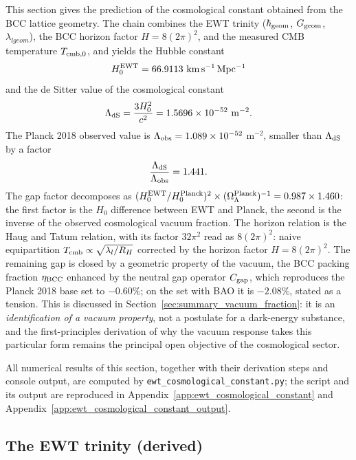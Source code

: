 \documentclass[10pt,a4paper]{article}
\begin{document}
This section gives the prediction of the cosmological constant
obtained from the BCC lattice geometry. The chain combines the EWT
trinity (\(\hbar_{\rm geom}\), \(G_{\rm geom}\), \(\lambda_{l geom}\)), the
BCC horizon factor \(H = 8(2\pi)^2\), and the measured CMB
temperature \(T_{\rm cmb,0}\), and yields the Hubble constant
\begin{equation}
	H_0^{\rm EWT} = 66.9113\ {\rm km\,s^{-1}\,Mpc^{-1}}
	\label{eq:cosmo_H0_intro}
\end{equation}
and the de Sitter value of the cosmological constant
\begin{equation}
	\Lambda_{\rm dS} = \frac{3 H_0^2}{c^2}
	= 1.5696\times 10^{-52}\ {\rm m^{-2}}.
	\label{eq:cosmo_Lambda_intro}
\end{equation}
The Planck 2018 observed value is
$\Lambda_{\rm obs} = 1.089\times 10^{-52}$ m$^{-2}$, smaller than
$\Lambda_{\rm dS}$ by a factor
\begin{equation}
	\frac{\Lambda_{\rm dS}}{\Lambda_{\rm obs}} = 1.441.
	\label{eq:cosmo_gap_intro}
\end{equation}
The gap factor decomposes as $(H_0^{\rm EWT}/H_0^{\rm Planck})^2
\times (\Omega_\Lambda^{\rm Planck})^{-1} = 0.987 \times 1.460$:
the first factor is the $H_0$ difference between EWT and Planck, the
second is the inverse of the observed cosmological vacuum fraction.
The horizon relation is the Haug and Tatum relation, with its factor
$32\pi^2$ read as $8(2\pi)^2$: naive equipartition
$T_{\rm cmb} \propto \sqrt{\lambda_l/R_H}$ corrected
by the horizon factor $H = 8(2\pi)^2$. The remaining gap is closed by
a geometric property of the vacuum, the BCC packing fraction
$\eta_{\rm BCC}$ enhanced by the neutral gap operator $C_{\rm gap}$,
which reproduces the Planck 2018 base set to $-0.60\%$; on the set
with BAO it is $-2.08\%$, stated as a tension. This is discussed
in Section~\ref{sec:summary_vacuum_fraction}: it is an
\emph{identification of a vacuum property}, not a postulate for a
dark-energy substance, and the first-principles derivation of why
the vacuum response takes this particular form remains the principal
open objective of the cosmological sector.

All numerical results of this section, together with their
derivation steps and console output, are computed by
\texttt{ewt\_cosmological\_constant.py}; the script and its output
are reproduced in Appendix~\ref{app:ewt_cosmological_constant} and
Appendix~\ref{app:ewt_cosmological_constant_output}.

\subsection{The EWT trinity (derived)}
\end{document}

